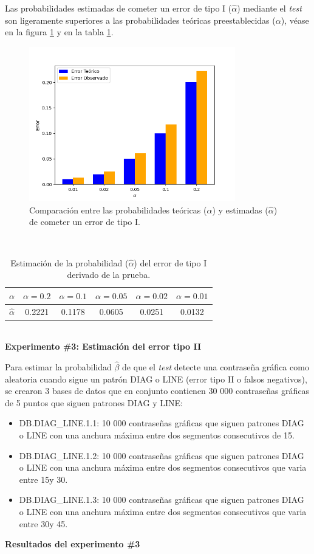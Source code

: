 \documentclass[12pt]{report}
\begin{document}
Las probabilidades estimadas de cometer un error de tipo I ($\hat{\alpha}$) mediante el \textit{test} son ligeramente superiores  a las probabilidades teóricas preestablecidas ($\alpha$), véase en la figura \ref{Teorico vs Observado} y en la tabla \ref{3td:error1-prob}.
	\begin{figure}[ht]
	\centering
	
	\includegraphics[width=0.8\textwidth]{3td_teo_obs.png}
	\caption{Comparación entre las probabilidades teóricas ($\alpha$) y estimadas ($\hat{\alpha}$) de cometer un error de tipo I. }
	\label{Teorico vs Observado}
\end{figure}\\
\begin{table}[h!]
	\centering
	\begin{tabular}{|c|ccccc|}
		\hline
		$\alpha$ & $\alpha = 0.2$ & $\alpha = 0.1$ & $\alpha = 0.05$ & $\alpha = 0.02$ & $\alpha = 0.01$ \\
		\hline
		$\hat{\alpha}$ & 0.2221 & 0.1178 & 0.0605 & 0.0251 & 0.0132 \\
		\hline
	\end{tabular}
	\caption{Estimación de la probabilidad ($\hat{\alpha}$) del error de tipo I derivado de la prueba.}
	\label{3td:error1-prob}
\end{table}
\\
\textbf{Experimento \#3: Estimación del error tipo II}

Para estimar la probabilidad $\hat{\beta}$ de que el \textit{test} detecte una contraseña gráfica como aleatoria cuando sigue un patrón DIAG o LINE  (error tipo II o falsos negativos), se crearon 3 bases de datos que en conjunto contienen 30 000 contraseñas gráficas de 5 puntos que siguen patrones DIAG y LINE:
\begin{itemize}
	\item DB.DIAG\_LINE.1.1: 10 000 contraseñas gráficas que siguen patrones DIAG o LINE con una anchura máxima entre dos segmentos consecutivos de 15\degree. 
	\item DB.DIAG\_LINE.1.2: 10 000 contraseñas gráficas que siguen patrones DIAG o LINE con una anchura máxima entre dos segmentos consecutivos que varia entre 15\degree y 30\degree. 
	\item DB.DIAG\_LINE.1.3: 10 000 contraseñas gráficas que siguen patrones DIAG o LINE con una anchura máxima entre dos segmentos consecutivos que varia entre 30\degree y 45\degree. 
\end{itemize}
\textbf{Resultados del experimento \#3}
\end{document}
